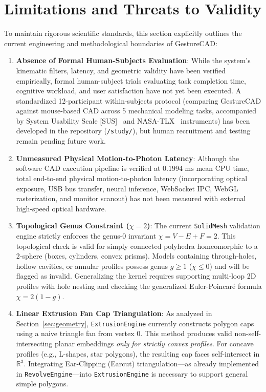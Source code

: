 \section{Limitations and Threats to Validity}
\label{sec:limitations}

To maintain rigorous scientific standards, this section explicitly outlines the current engineering and methodological boundaries of GestureCAD:

\begin{enumerate}
    \item \textbf{Absence of Formal Human-Subjects Evaluation}: While the system's kinematic filters, latency, and geometric validity have been verified empirically, formal human-subject trials evaluating task completion time, cognitive workload, and user satisfaction have not yet been executed. A standardized 12-participant within-subjects protocol (comparing GestureCAD against mouse-based CAD across 5 mechanical modeling tasks, accompanied by System Usability Scale [SUS]~\cite{brooke1996sus} and NASA-TLX~\cite{hart1988nasa} instruments) has been developed in the repository (\texttt{/study/}), but human recruitment and testing remain pending future work.
    \item \textbf{Unmeasured Physical Motion-to-Photon Latency}: Although the software CAD execution pipeline is verified at $0.1994\text{ ms}$ mean CPU time, total end-to-end physical motion-to-photon latency (incorporating optical exposure, USB bus transfer, neural inference, WebSocket IPC, WebGL rasterization, and monitor scanout) has not been measured with external high-speed optical hardware.
    \item \textbf{Topological Genus Constraint ($\chi = 2$)}: The current \texttt{SolidMesh} validation engine strictly enforces the genus-0 invariant $\chi = V - E + F = 2$. This topological check is valid for simply connected polyhedra homeomorphic to a 2-sphere (boxes, cylinders, convex prisms). Models containing through-holes, hollow cavities, or annular profiles possess genus $g \ge 1$ ($\chi \le 0$) and will be flagged as invalid. Generalizing the kernel requires supporting multi-loop 2D profiles with hole nesting and checking the generalized Euler-Poincar\'e formula $\chi = 2(1 - g)$.
    \item \textbf{Linear Extrusion Fan Cap Triangulation}: As analyzed in Section~\ref{sec:geometry}, \texttt{ExtrusionEngine} currently constructs polygon caps using a naive triangle fan from vertex 0. This method produces valid non-self-intersecting planar embeddings \textit{only for strictly convex profiles}. For concave profiles (e.g., L-shapes, star polygons), the resulting cap faces self-intersect in $\mathbb{R}^3$. Integrating Ear-Clipping (Earcut) triangulation---as already implemented in \texttt{RevolveEngine}---into \texttt{ExtrusionEngine} is necessary to support general simple polygons.

\end{enumerate}

